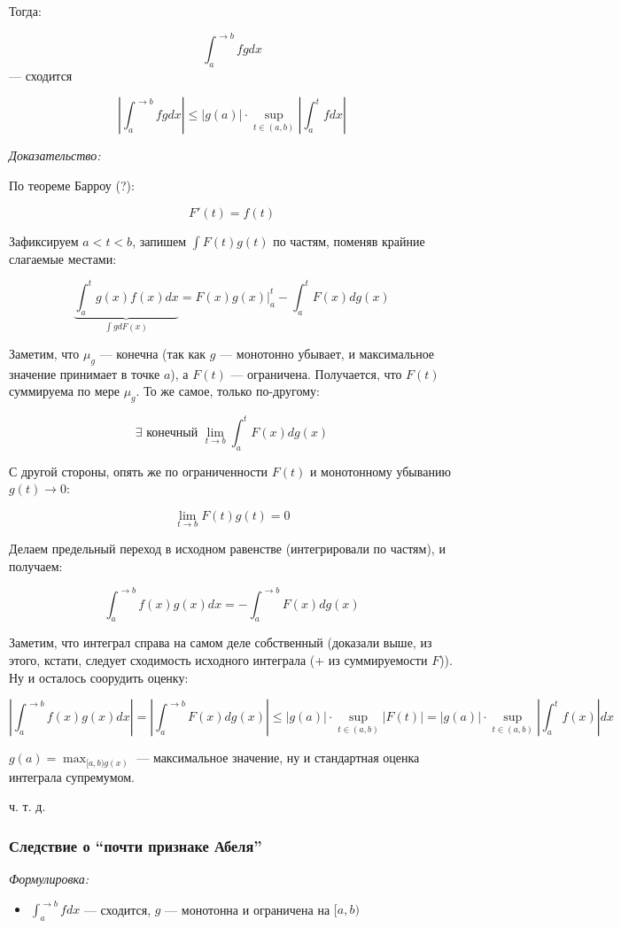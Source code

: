 \documentclass{article}
\begin{document}
Тогда:

\[\int_{a}^{\rightarrow b} fg dx\] --- сходится

\[\left|\int_{a}^{\rightarrow b} fg dx\right| \le |g(a)| \cdot \sup_{t \in (a, b)} \left|\int_{a}^{t} f dx\right|\]

\textit{Доказательство:}

По теореме Барроу (?):

\[F'(t) = f(t)\]

Зафиксируем $a < t < b$, запишем $\int F(t)g(t)$ по частям, поменяв крайние слагаемые местами:

\[\underbrace{\int_a^t g(x) f(x)dx}_{\int g dF(x)} = F(x)g(x)|_a^t - \int_a^t F(x) dg(x)\]

Заметим, что $\mu_g$ --- конечна (так как $g$ --- монотонно убывает, и максимальное значение принимает в точке $a$),  а $F(t)$ --- ограничена. Получается, что $F(t)$ суммируема по мере $\mu_g$. То же самое, только по-другому:

\[\exists \text{ конечный }\lim_{t \rightarrow b} \int_{a}^{t}F(x)dg(x)\]

С другой стороны, опять же по ограниченности $F(t)$ и монотонному убыванию $g(t) \rightarrow 0$:

\[\lim_{t \rightarrow b} F(t)g(t) = 0\]

Делаем предельный переход в исходном равенстве (интегрировали по частям), и получаем:

\[\int_a^{\rightarrow b} f(x)g(x) dx = -\int_a^{\rightarrow b} F(x)dg(x)\]

Заметим, что интеграл справа на самом деле собственный (доказали выше, из этого, кстати, следует сходимость исходного интеграла (+ из суммируемости $F$)). Ну и осталось соорудить оценку:

\[\left|\int_a^{\rightarrow b} f(x)g(x) dx\right| = \left|\int_a^{\rightarrow b} F(x)dg(x)\right| \le |g(a)| \cdot \sup_{t \in (a, b)}|F(t)| = |g(a)| \cdot \sup_{t \in (a, b)} \left|\int_a^t f(x)\right| dx\]

$g(a) = \max_{[a, b) g(x)}$ --- максимальное значение, ну и стандартная оценка интеграла супремумом.

ч. т. д. 

\subsubsection{Следствие о ``почти признаке Абеля''}
\textit{Формулировка:}

\begin{itemize}
    \item $\int_{a}^{\rightarrow b} f dx$ --- сходится, $g$ --- монотонна и ограничена на $[a, b)$
\end{itemize}
\end{document}
